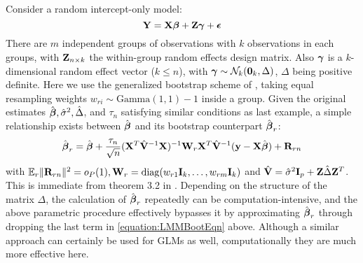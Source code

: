 \begin{Example}
%
\end{Example}

\begin{Example}
Consider a random intercept-only model:
%
$$ {\mathbf{Y}} = {\mathbf{X}} {\boldsymbol{\beta}} + {\mathbf{Z}} {\boldsymbol{\gamma}} + {\boldsymbol{\epsilon}} $$
%
There are $m$ independent groups of observations with $k$ observations in each groups, with ${\mathbf{Z}}_{n \times k}$ the within-group random effects design matrix. Also ${\boldsymbol{\gamma}}$ is a $k$-dimensional random effect vector ($k \leq n$), with ${\boldsymbol{\gamma}} \sim \mathcal{N}_k ({\bf 0}_k, \Delta)$, $\Delta$ being positive definite. Here we use the generalized bootstrap scheme of \cite{ChatterjeeBose05}, taking equal resampling weights $w_{r i} \sim \text{Gamma}(1, 1 ) - 1$ inside a group. Given the original estimates $\hat {{\boldsymbol{\beta}}}, \hat \sigma^2, \hat \Delta$, and $\tau_n$ satisfying similar conditions as last example, a simple relationship exists between $\hat {{\boldsymbol{\beta}}}$ and its bootstrap counterpart $\hat {{\boldsymbol{\beta}}}_r$:
%
\begin{align}\label{equation:LMMBootEqn}
\hat {{\boldsymbol{\beta}}}_r = \hat {{\boldsymbol{\beta}}} + \frac{\tau_n}{\sqrt n} ({\mathbf{X}}^T \hat {{\mathbf{V}}}^{-1} {\mathbf{X}})^{-1} {\mathbf{W}}_r {\mathbf{X}}^T \hat {{\mathbf{V}}}^{-1} ({\bf{y}} - {\mathbf{X}} \hat {{\boldsymbol{\beta}}}) + {\mathbf{R}}_{r n}
\end{align}
%
with ${\mathbb{E}}_r \| {\mathbf{R}}_{r n} \|^2 = o_P(1), {\mathbf{W}}_r = \operatorname*{diag} (w_{r 1} {\mathbf{I}}_k, \ldots, w_{r m} {\mathbf{I}}_k)$ and $\hat {{\mathbf{V}}} = \hat \sigma^2 {\mathbf{I}}_p + {\mathbf{Z}} \hat\Delta {\mathbf{Z}}^T$. This is immediate from theorem 3.2 in \cite{ChatterjeeBose05}. Depending on the structure of the matrix $\Delta$, the calculation of $\hat {{\boldsymbol{\beta}}}_r$ repeatedly can be computation-intensive, and the above parametric procedure effectively bypasses it by approximating $\hat {{\boldsymbol{\beta}}}_r$ through dropping the last term in \ref{equation:LMMBootEqn} above. Although a similar approach can certainly be used for GLMs as well, computationally they are much more effective here. %
\end{Example}